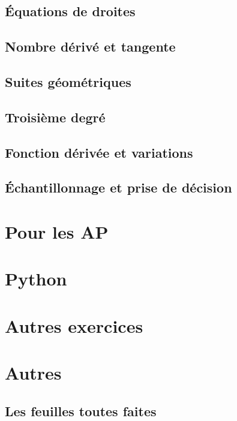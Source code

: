 \documentclass[a4paper,10pt]{book}
\begin{document}
\chapter{Équations de droites}


\chapter{Nombre dérivé et tangente}


\chapter{Suites géométriques}


\chapter{Troisième degré}


\chapter{Fonction dérivée et variations}


\chapter{Échantillonnage et prise de décision}


\part{Pour les AP}



\part{Python}



\part{Autres exercices}



\part{Autres}

\chapter{Les feuilles toutes faites}








\end{document}
